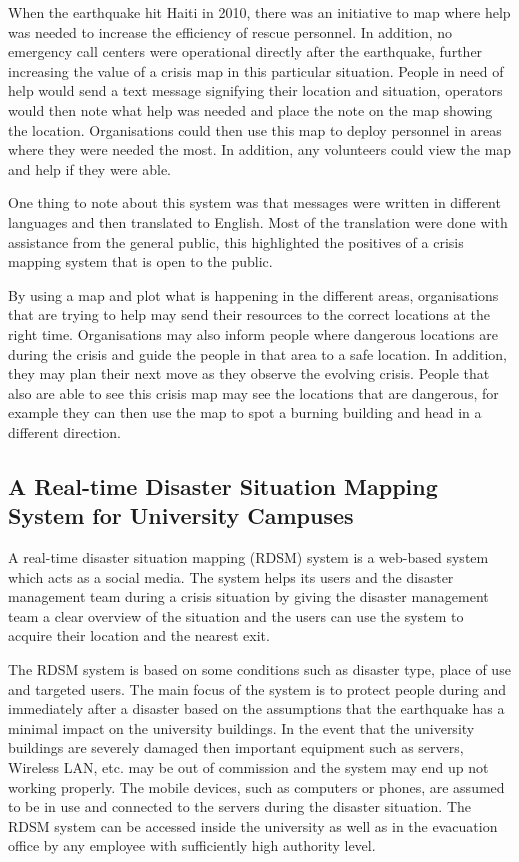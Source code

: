 When the earthquake hit Haiti in 2010, there was an initiative to map where help was needed to increase the efficiency of rescue personnel. In addition, no emergency call centers were operational directly after the earthquake, further increasing the value of a crisis map in this particular situation. People in need of help would send a text message signifying their location and situation, operators would then note what help was needed and place the note on the map showing the location. Organisations could then use this map to deploy personnel in areas where they were needed the most. In addition, any volunteers could view the map and help if they were able.

One thing to note about this system was that messages were written in different languages and then translated to English. Most of the translation were done with assistance from the general public, this highlighted the positives of a crisis mapping system that is open to the public.

By using a map and plot what is happening in the different areas, organisations that are trying to help may send their resources to the correct locations at the right time. Organisations may also inform people where dangerous locations are during the crisis and guide the people in that area to a safe location. In addition, they may plan their next move as they observe the evolving crisis. People that also are able to see this crisis map may see the locations that are dangerous, for example they can then use the map to spot a burning building and head in a different direction. 

\subsection{A Real-time Disaster Situation Mapping System for University Campuses}

A real-time disaster situation mapping (RDSM) system is a web-based system which acts as a social media. The system helps its users and the disaster management team during a crisis situation by giving the disaster management team a clear overview of the situation and the users can use the system to acquire their location and the nearest exit.

The RDSM system is based on some conditions such as disaster type, place of use and targeted users. The main focus of the system is to protect people during and immediately after a disaster based on the assumptions that the earthquake has a minimal impact on the university buildings. In the event that the university buildings are severely damaged then important equipment such as servers, Wireless LAN, etc. may be out of commission and the system may end up not working properly. The mobile devices, such as computers or phones, are assumed to be in use and connected to the servers during the disaster situation. The RDSM system can be accessed inside the university as well as in the evacuation office by any employee with sufficiently high authority level.


